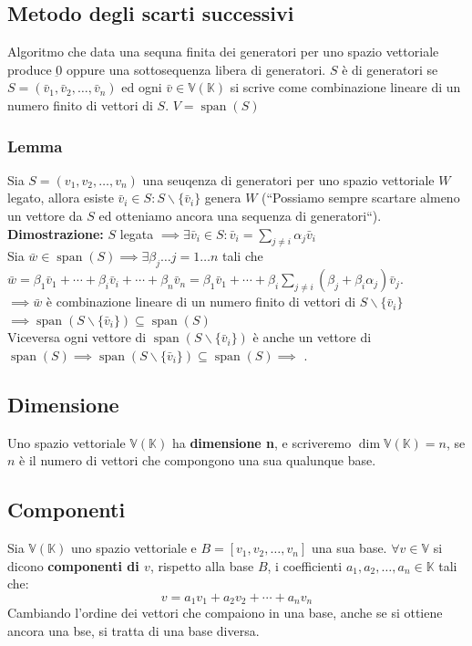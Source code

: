 \documentclass{article}
\DeclareMathOperator{\Span}{span}
\renewcommand\fbox{\fcolorbox{red}{white}}
\newcommand{\V}{\mathbb{V} (\mathbb{K})}
\newcommand{\s}[2]{#1_1, #1_2, \ldots, #1_{#2}}
\newcommand{\ah}{\alpha}
\newcommand{\bh}{\beta}
\begin{document}
\subsection{Metodo degli scarti successivi}
Algoritmo che data una sequna finita dei generatori per uno spazio vettoriale
produce $\underbar{0}$ oppure una sottosequenza libera di generatori. $S$ è di
generatori se $S= (\s{\bar{v}}{n})$ ed ogni $\bar{v}\in\V$ si scrive come
combinazione lineare di un numero finito di vettori di $S$. $V = \Span(S)$

\subsubsection{Lemma}
Sia $S=(\s{v}{n})$ una seuqenza di generatori per uno spazio vettoriale $W$
legato, allora esiste $\bar{v}_i\in S:S\smallsetminus\{\bar v_i\}$ genera $W$
(``Possiamo sempre scartare almeno un vettore da $S$ ed otteniamo ancora una
sequenza di generatori``).\\ \textbf{Dimostrazione:} $S$ legata
$\implies\exists\bar{v}_i\in S:\bar v_i=\sum_{j\ne i}^{}\ah_j\bar v_i$ \\ Sia
$\bar{w}\in\Span(S)\implies\exists\bh_j\ldots j=1\ldots n$ tali che
$\bar{w}=\bh_1\bar{v}_1+\cdots+\bh_i\bar{v}_i+\cdots+\bh_n\bar{v}_n =
    \bh_1\bar{v}_1+\cdots+\bh_i\sum_{j\ne i}^{}(\bh_j+\bh_i\ah_j)\bar{v}_j$.\\
$\implies \bar{w}$ è combinazione lineare di un numero finito di vettori di
$S\smallsetminus\{\bar{v}_i\}$\\ $\implies
    \Span(S\smallsetminus\{\bar{v}_i\})\subseteq\Span(S)$\\ Viceversa ogni vettore
di $\Span(S\smallsetminus\{\bar{v}_i\})$ è anche un vettore di
$\Span(S)\implies\Span(S\smallsetminus\{\bar{v}_i\})\subseteq\Span(S)\implies$
\fbox{$\Span(S\smallsetminus\{\bar{v}_i\})=\Span(S)$}.

\subsection{Dimensione}
Uno spazio vettoriale $\V$ ha \textbf{dimensione n}, e scriveremo $\dim\V = n$,
se $n$ è il numero di vettori che compongono una sua qualunque base.

\subsection{Componenti}
Sia $\V$ uno spazio vettoriale e $B = [\s{v}{n}]$ una sua base. $\forall v \in
    \mathbb V$ si dicono \textbf{componenti di $v$}, rispetto alla base $B$, i
coefficienti $a_1, a_2,\ldots,a_n \in \mathbb K$ tali che:
\[
    v = a_1 v_1+a_2 v_2 +\cdots+a_n v_n
\]
Cambiando l'ordine dei vettori che compaiono in una base, anche se si ottiene
ancora una bse, si tratta di una base diversa.
\end{document}
